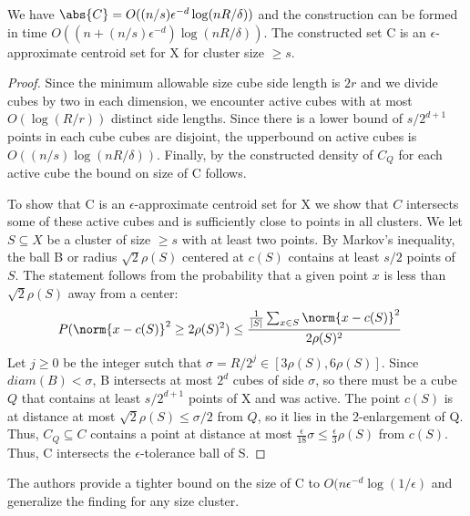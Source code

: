 \begin{lemma}We have $\abs{C} = O((n/s)\epsilon^{-d} \log(nR/\delta))$ and the construction can be formed in time $O((n+(n/s)\epsilon^{-d}) \log(nR/\delta))$. The constructed set C is an $\epsilon$-approximate centroid set for X for cluster size $\geq s$.
\end{lemma}
\begin{proof}
Since the minimum allowable size cube side length is $2r$ and we divide cubes by two in each dimension, we encounter active cubes with at most $O(\log(R/r))$ distinct side lengths. Since there is a lower bound of $s/2^{d+1}$ points in each cube cubes are disjoint, the upperbound on active cubes is $O((n/s)\log(nR/\delta))$. Finally, by the constructed density of $C_Q$ for each active cube the bound on size of C follows. 

\noindent To show that C is an $\epsilon$-approximate centroid set for X we show that $C$ intersects some of these active cubes and is sufficiently close to points in all clusters. We let $S \subseteq X$ be a cluster of size $\geq s$ with at least two points. By Markov's inequality, the ball B or radius $\sqrt{2}\rho(S)$ centered at $c(S)$ contains at least $s/2$ points of $S$. The statement follows from the probability that a given point $x$ is less than $\sqrt{2}\rho(S)$ away from a center:
\begin{align*}
    P(\norm{x-c(S)}^2 \geq 2\rho(S)^2) & \leq \frac{\frac{1}{|S|}\sum_{x\in S} \norm{x-c(S)}^2 }{2\rho(S)^2} 
\end{align*}
Let $j \geq 0$ be the integer sutch that $\sigma = R/2^j \in [3\rho(S),6\rho(S)]$. Since $diam(B) < \sigma$, B intersects at most $2^d$ cubes of side $\sigma$, so there must be a cube $Q$ that contains at least $s/2^{d+1}$ points of X and was active. The point $c(S)$ is at distance at most $\sqrt{2}\rho(S) \leq \sigma/2$ from $Q$, so it lies in the 2-enlargement of Q. Thus, $C_Q \subseteq C$ contains a point at distance at most $\frac{\epsilon}{18} \sigma \leq \frac{\epsilon}{3}\rho(S)$ from $c(S)$. Thus, C intersects the $\epsilon$-tolerance ball of S. 
\end{proof}

\begin{remark}
The authors provide a tighter bound on the size of C to $O(n\epsilon^{-d}\log(1/\epsilon)$ and generalize the finding for any size cluster.
\end{remark}
\newpage
